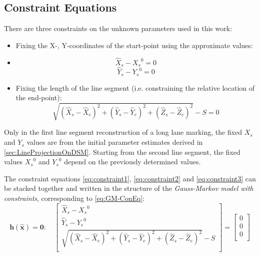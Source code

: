 \subsection{Constraint Equations}
\label{subsec:ConEqua}

There are three constraints on the unknown parameters used in this work:
\begin{itemize}
\item Fixing the X-, Y-coordinates of the start-point using the approximate values:
\item [] \begin{equation} \label{eq:constraint1}
\hat{X}_s-{X_s}^0=0
\end{equation}
\begin{equation} \label{eq:constraint2}
\hat{Y}_s-{Y_s}^0=0
\end{equation}
\item Fixing the length of the line segment (i.e. constraining the relative location of the end-point):
\begin{equation} \label{eq:constraint3}
\sqrt{(\hat{X}_s-\hat{X}_e)^2+(\hat{Y}_s-\hat{Y}_e)^2+(\hat{Z}_s-\hat{Z}_e)^2}-S=0
\end{equation}
\end{itemize}

Only in the first line segment reconstruction of a long lane marking, the fixed $X_s$ and $Y_s$ values are from the initial parameter estimates derived in \cref{sec:LineProjectionOnDSM}. Starting from the second line segment, the fixed values ${X_s}^0$ and ${Y_s}^0$ depend on the previously determined values.

The constraint equations \eqref{eq:constraint1}, \eqref{eq:constraint2} and \eqref{eq:constraint3} can be stacked together and written in the structure of the \textit{Gauss-Markov model with constraints}, corresponding to \cref{eq:GM-ConEq}:
\begin{equation} \label{eq:convec}
\boldsymbol h(\widehat{\boldsymbol x})=\mathbf{0}:\quad
\begin{bmatrix}
 \hat{X}_s-{X_s}^0\\[0.3em]
 \hat{Y}_s-{Y_s}^0\\[0.3em]
 \sqrt{(\hat{X}_s-\hat{X}_e)^2+(\hat{Y}_s-\hat{Y}_e)^2+(\hat{Z}_s-\hat{Z}_e)^2}-S\\[0.3em]
\end{bmatrix}
=
\begin{bmatrix}
 0\\[0.3em]
 0\\[0.3em]
 0\\[0.5em]
\end{bmatrix}
\end{equation}


